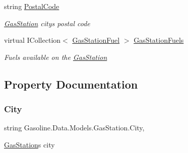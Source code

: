 \begin{DoxyCompactItemize}
string \mbox{\hyperlink{class_gasoline_1_1_data_1_1_models_1_1_gas_station_ae7821db2743b82b2e9637a27fdf32260}{Postal\+Code}}
\begin{DoxyCompactList}\small\item\em \mbox{\hyperlink{class_gasoline_1_1_data_1_1_models_1_1_gas_station}{Gas\+Station}} city\textquotesingle{}s postal code \end{DoxyCompactList}\item 
virtual I\+Collection$<$ \mbox{\hyperlink{class_gasoline_1_1_data_1_1_models_1_1_gas_station_fuel}{Gas\+Station\+Fuel}} $>$ \mbox{\hyperlink{class_gasoline_1_1_data_1_1_models_1_1_gas_station_af8c9bb378b9b624857981086d9f8609f}{Gas\+Station\+Fuels}}
\begin{DoxyCompactList}\small\item\em Fuels available on the \mbox{\hyperlink{class_gasoline_1_1_data_1_1_models_1_1_gas_station}{Gas\+Station}} \end{DoxyCompactList}\end{DoxyCompactItemize}


\subsection{Property Documentation}
\mbox{\label{class_gasoline_1_1_data_1_1_models_1_1_gas_station_a9033f70b9e035a061f48ec316fb9b23f}} 
\subsubsection{\texorpdfstring{City}{City}}
{\footnotesize\ttfamily string Gasoline.\+Data.\+Models.\+Gas\+Station.\+City\hspace{0.3cm}{\ttfamily [get]}, {\ttfamily [set]}}



\mbox{\hyperlink{class_gasoline_1_1_data_1_1_models_1_1_gas_station}{Gas\+Station}}\textquotesingle{}s city 

\mbox{\label{class_gasoline_1_1_data_1_1_models_1_1_gas_station_af8c9bb378b9b624857981086d9f8609f}} 
